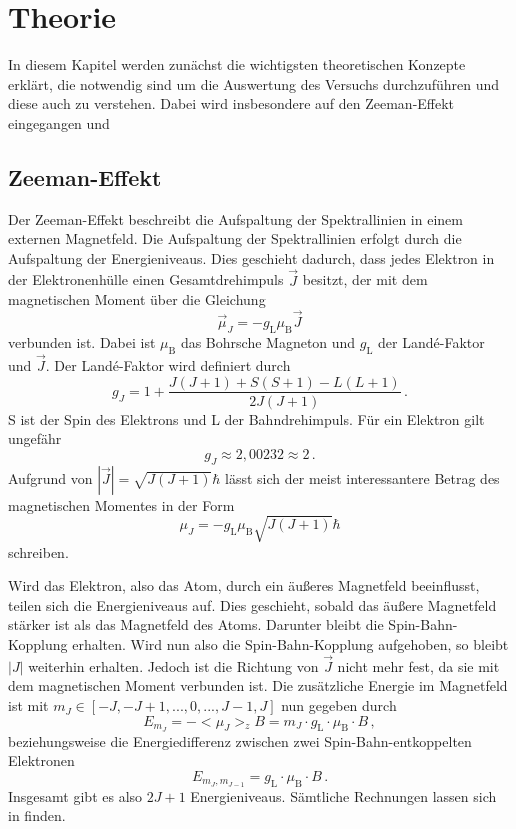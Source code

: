\section{Theorie}
\label{sec:Theorie}

In diesem Kapitel werden zunächst die wichtigsten theoretischen Konzepte erklärt, die notwendig sind um die Auswertung des Versuchs durchzuführen
und diese auch zu verstehen.
Dabei wird insbesondere auf den Zeeman-Effekt eingegangen und 

\subsection{Zeeman-Effekt}

Der Zeeman-Effekt beschreibt die Aufspaltung der Spektrallinien in einem externen Magnetfeld.
Die Aufspaltung der Spektrallinien erfolgt durch die Aufspaltung der Energieniveaus.
Dies geschieht dadurch, dass jedes Elektron in der Elektronenhülle einen Gesamtdrehimpuls $\vec{J}$ besitzt,
der mit dem magnetischen Moment über die Gleichung
\begin{equation*}
    \vec{\mu}_J = - g_\text{L} \mu_\text{B} \vec{J}
\end{equation*}
verbunden ist.
Dabei ist $\mu_\text{B}$ das Bohrsche Magneton und $g_\text{L}$ der Landé-Faktor und $\vec{J}$.
Der Landé-Faktor wird definiert durch 
\begin{equation*}
    g_J = 1 + \frac{J(J+1) + S(S+1) - L(L+1)}{2 J(J+1)} \, .
\end{equation*}
S ist der Spin des Elektrons und L der Bahndrehimpuls.
Für ein Elektron gilt ungefähr
\begin{equation*}
    g_J \approx 2,00232 \approx 2 \, .
\end{equation*}
Aufgrund von $|\vec{J}| = \sqrt{J(J+1)} \hbar$ lässt sich der meist interessantere Betrag des magnetischen Momentes in der Form
\begin{equation*}
   \mu_J = - g_\text{L} \mu_\text{B} \sqrt{J(J+1)} \hbar
\end{equation*}
schreiben.

Wird das Elektron, also das Atom, durch ein äußeres Magnetfeld beeinflusst, teilen sich die Energieniveaus auf.
Dies geschieht, sobald das äußere Magnetfeld stärker ist als das Magnetfeld des Atoms.
Darunter bleibt die Spin-Bahn-Kopplung erhalten.
Wird nun also die Spin-Bahn-Kopplung aufgehoben, so bleibt $|J|$ weiterhin erhalten.
Jedoch ist die Richtung von $\vec{J}$ nicht mehr fest, da sie mit dem magnetischen Moment verbunden ist.
Die zusätzliche Energie im Magnetfeld ist mit $m_J \in [-J, -J+1,...,0,...,J-1, J]$ nun gegeben durch
\begin{equation}
    E_{m_J} = - <\mu_J>_z B = m_J \cdot g_\text{L} \cdot \mu_\text{B} \cdot B \, ,
\end{equation}
beziehungsweise die Energiedifferenz zwischen zwei Spin-Bahn-entkoppelten Elektronen
\begin{equation}
    E_{m_J,m_{J-1}} = g_\text{L} \cdot \mu_\text{B}\cdot B \, .
\end{equation}
Insgesamt gibt es also $2J+1$ Energieniveaus.
Sämtliche Rechnungen lassen sich in \cite{demtroeder3} finden.

